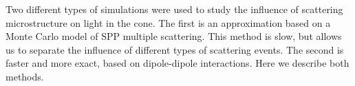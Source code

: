 Two different types of simulations were used to study the influence of
scattering microstructure on light in the cone.  The first is an
approximation based on a Monte Carlo model of SPP multiple scattering.
This method is slow, but allows us to separate the influence of different
types of scattering events.  The second is faster and more exact, based on
dipole-dipole interactions.  Here we describe both methods.
